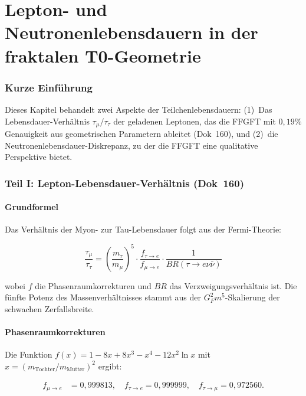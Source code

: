 \chapter{Lepton- und Neutronenlebensdauern in der fraktalen T0-Geometrie}


	
	\subsection*{Kurze Einführung}
	
	Dieses Kapitel behandelt zwei Aspekte der Teilchenlebensdauern: (1)~Das Lebensdauer-Verhältnis \(\tau_\mu/\tau_\tau\) der geladenen Leptonen, das die FFGFT mit \(0{,}19\%\) Genauigkeit aus geometrischen Parametern ableitet (Dok~160), und (2)~die Neutronenlebensdauer-Diskrepanz, zu der die FFGFT eine qualitative Perspektive bietet.
	
	
	\subsection*{Teil I: Lepton-Lebensdauer-Verhältnis (Dok~160)}
	
	\subsubsection*{Grundformel}
	
	Das Verhältnis der Myon- zur Tau-Lebensdauer folgt aus der Fermi-Theorie:
	
	\begin{equation}
		\frac{\tau_\mu}{\tau_\tau} = \left(\frac{m_\tau}{m_\mu}\right)^5 \cdot \frac{f_{\tau \to e}}{f_{\mu \to e}} \cdot \frac{1}{BR(\tau \to e \nu \bar\nu)}
	\end{equation}
	
	wobei \(f\) die Phasenraumkorrekturen und \(BR\) das Verzweigungsverhältnis ist. Die fünfte Potenz des Massenverhältnisses stammt aus der \(G_F^2 m^5\)-Skalierung der schwachen Zerfallsbreite.
	
	\subsubsection*{Phasenraumkorrekturen}
	
	Die Funktion \(f(x) = 1 - 8x + 8x^3 - x^4 - 12x^2 \ln x\) mit \(x = (m_\text{Tochter}/m_\text{Mutter})^2\) ergibt:
	
	\begin{align}
		f_{\mu \to e} &= 0{,}999813, \quad f_{\tau \to e} = 0{,}999999, \quad f_{\tau \to \mu} = 0{,}972560.
	\end{align}
	
